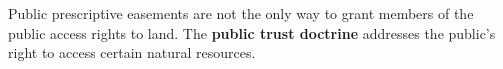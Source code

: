 Public prescriptive easements are not the only way to grant members of the
public access rights to land. The \textbf{public trust doctrine} addresses the
public's right to access certain natural resources.

